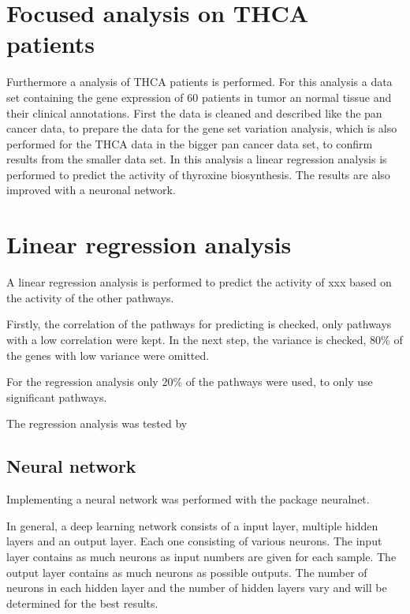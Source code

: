 \documentclass[
  parskip,
  oneside]{scrreprt}
\begin{document}
\hypertarget{focused-analysis-on-thca-patients}{%
\section{Focused analysis on THCA
patients}\label{focused-analysis-on-thca-patients}}

Furthermore a analysis of THCA patients is performed. For this analysis
a data set containing the gene expression of 60 patients in tumor an
normal tissue and their clinical annotations. First the data is cleaned
and described like the pan cancer data, to prepare the data for the gene
set variation analysis, which is also performed for the THCA data in the
bigger pan cancer data set, to confirm results from the smaller data
set. In this analysis a linear regression analysis is performed to
predict the activity of thyroxine biosynthesis. The results are also
improved with a neuronal network.

\hypertarget{linear-regression-analysis}{%
\section{Linear regression analysis}\label{linear-regression-analysis}}

A linear regression analysis is performed to predict the activity of xxx
based on the activity of the other pathways.

Firstly, the correlation of the pathways for predicting is checked, only
pathways with a low correlation were kept. In the next step, the
variance is checked, 80\% of the genes with low variance were omitted.

For the regression analysis only 20\% of the pathways were used, to only
use significant pathways.

The regression analysis was tested by

\hypertarget{neural-network}{%
\subsection{Neural network}\label{neural-network}}

Implementing a neural network was performed with the package neuralnet.

In general, a deep learning network consists of a input layer, multiple
hidden layers and an output layer. Each one consisting of various
neurons. The input layer contains as much neurons as input numbers are
given for each sample. The output layer contains as much neurons as
possible outputs. The number of neurons in each hidden layer and the
number of hidden layers vary and will be determined for the best
results.
\end{document}
